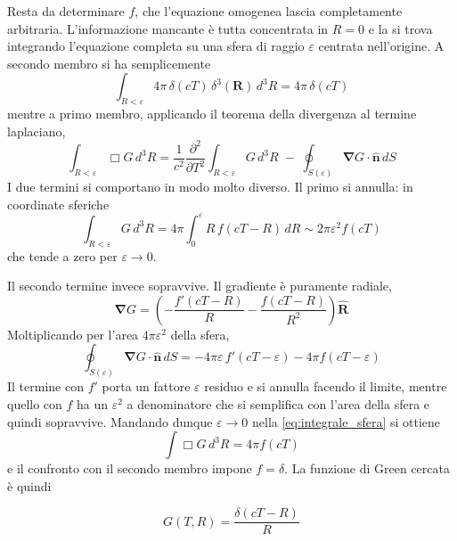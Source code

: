 Resta da determinare $f$, che l'equazione omogenea lascia completamente arbitraria. L'informazione mancante è tutta concentrata in $R = 0$ e la si trova integrando l'equazione completa su una sfera di raggio $\varepsilon$ centrata nell'origine. A secondo membro si ha semplicemente
\begin{equation*}
    \int_{R<\varepsilon} 4\pi\,\delta(cT)\,\delta^3(\mathbf{R})\,d^3R = 4\pi\,\delta(cT)
\end{equation*}
mentre a primo membro, applicando il teorema della divergenza al termine laplaciano,
\begin{equation}
    \int_{R<\varepsilon}\Box G\,d^3R = \frac{1}{c^2}\frac{\partial^2}{\partial T^2}\int_{R<\varepsilon} G\,d^3R \;-\; \oint_{S(\varepsilon)}\boldsymbol{\nabla}G\cdot\hat{\mathbf{n}}\,dS
    \label{eq:integrale_sfera}
\end{equation}
I due termini si comportano in modo molto diverso. Il primo si annulla: in coordinate sferiche
\begin{equation*}
    \int_{R<\varepsilon} G\,d^3R = 4\pi\int_0^\varepsilon R\,f(cT-R)\,dR \sim 2\pi\varepsilon^2 f(cT)
\end{equation*}
che tende a zero per $\varepsilon \to 0$.

Il secondo termine invece sopravvive. Il gradiente è puramente radiale,
\begin{equation*}
    \boldsymbol{\nabla}G = \left(-\frac{f'(cT-R)}{R} - \frac{f(cT-R)}{R^2}\right)\hat{\mathbf{R}}
\end{equation*}
Moltiplicando per l'area $4\pi\varepsilon^2$ della sfera,
\begin{equation*}
    \oint_{S(\varepsilon)}\boldsymbol{\nabla}G\cdot\hat{\mathbf{n}}\,dS = -4\pi\varepsilon\,f'(cT-\varepsilon) - 4\pi f(cT-\varepsilon)
\end{equation*}
Il termine con $f'$ porta un fattore $\varepsilon$ residuo e si annulla facendo il limite, mentre quello con $f$ ha un $\varepsilon^2$ a denominatore che si semplifica con l'area della sfera e quindi sopravvive. Mandando dunque $\varepsilon \to 0$ nella \eqref{eq:integrale_sfera} si ottiene
\begin{equation*}
    \int \Box G\,d^3R = 4\pi f(cT)
\end{equation*}
e il confronto con il secondo membro impone $f = \delta$. La funzione di Green cercata è quindi
\begin{tcolorbox}[colback=black!5!white, colframe=black!45!white, boxrule=0.8pt]
\begin{equation}
    G(T,R) = \frac{\delta(cT-R)}{R}
    \label{eq:green_ritardata}
\end{equation}
\end{tcolorbox}

